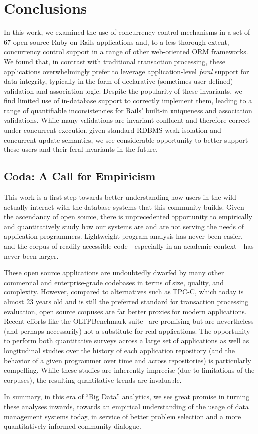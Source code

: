 
\section{Conclusions}
\label{sec:conclusion}

In this work, we examined the use of concurrency control mechanisms in
a set of 67 open source Ruby on Rails applications and, to a less
thorough extent, concurrency control support in a range of other
web-oriented ORM frameworks. We found that, in contrast with
traditional transaction processing, these applications overwhelmingly
prefer to leverage application-level \textit{feral} support for data
integrity, typically in the form of declarative (sometimes
user-defined) validation and association logic. Despite the popularity
of these invariants, we find limited use of in-database support to
correctly implement them, leading to a range of quantifiable
inconsistencies for Rails' built-in uniqueness and association
validations. While many validations are invariant confluent and
therefore correct under concurrent execution given standard RDBMS weak
isolation and concurrent update semantics, we see considerable
opportunity to better support these users and their feral invariants
in the future.


\subsection*{Coda: A Call for Empiricism}

This work is a first step towards better understanding how users in
the wild actually interact with the database systems that this
community builds. Given the ascendancy of open source, there is
unprecedented opportunity to empirically and quantitatively study how
our systems are and are not serving the needs of application
programmers. Lightweight program analysis has never been easier, and
the corpus of readily-accessible code---especially in an academic
context---has never been larger.

These open source applications are undoubtedly dwarfed by many other
commercial and enterprise-grade codebases in terms of size, quality,
and complexity. However, compared to alternatives such as TPC-C, which
today is almost 23 years old and is still the preferred standard for
transaction processing evaluation, open source corpuses are far better
proxies for modern applications. Recent efforts like the OLTPBenchmark
suite~\cite{oltpbench} are promising but are nevertheless (and perhaps
necessarily) not a substitute for real applications. The opportunity
to perform both quantitative surveys across a large set of
applications as well as longitudinal studies over the history of each
application repository (and the behavior of a given programmer over
time and across repositories) is particularly compelling. While these
studies are inherently imprecise (due to limitations of the corpuses),
the resulting quantitative trends are invaluable.

In summary, in this era of ``Big Data'' analytics, we see great
promise in turning these analyses inwards, towards an empirical
understanding of the usage of data management systems today, in service of
better problem selection and a more quantitatively informed community
dialogue.

